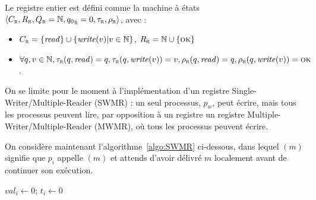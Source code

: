 
\begingroup

\begin{exercice}
  Le registre entier est défini comme la machine à états $\langle C_{\textsc{r}}, R_{\textsc{r}}, Q_{\textsc{r}} = \mathbb{N}, {q_0}_{\textsc{r}} = 0, \tau_{\textsc{r}}, \rho_{\textsc{r}} \rangle$, avec :
  \begin{itemize}
  \item $C_{\textsc{r}} = \{\mathit{read}\} \cup \{\mathit{write}(v) | v\in \mathbb{N}\}$, $R_{\textsc{r}} = \mathbb{N} \cup \{\textsc{ok}\}$
  \item $\forall q, v\in \mathbb{N}, \tau_{\textsc{r}}(q, \mathit{read}) = q, \tau_{\textsc{r}}(q, \mathit{write}(v)) = v, \rho_{\textsc{r}}(q, \mathit{read}) = q, \rho_{\textsc{r}}(q, \mathit{write}(v)) = \textsc{ok}$. 
  \end{itemize}
  On se limite pour le moment à l'implémentation d'un registre Single-Writer/Multiple-Reader (SWMR) : un seul processus, $p_w$,
  peut écrire, mais tous les processus peuvent lire, par opposition à un registre un registre Multiple-Writer/Multiple-Reader (MWMR),
  où tous les processus peuvent écrire.

  On considère maintenant l'algorithme~\ref{algo:SWMR} ci-dessous, dans lequel $(m)$ signifie que $p_i$ appelle $(m)$
  et attends d'avoir délivré $m$ localement avant de continuer son exécution.
  
  \begin{algorithm}
    $val_i \leftarrow 0$; $t_i \leftarrow 0$ \;
    \caption{Implémentation d'un registre SWMR dans $\mathcal{CAMP}_{n, t}[mutual-broadcast]$ (code pour $p_i$)}
    \label{algo:SWMR}
  \end{algorithm}


\end{exercice}
